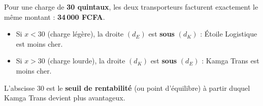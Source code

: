 \documentclass[11pt]{article}
\begin{document}
\begin{aretenir}
Pour une charge de \textbf{30 quintaux}, les deux transporteurs facturent exactement le même montant : \textbf{34\,000 FCFA}.
\begin{itemize}
    \item Si $x < 30$ (charge légère), la droite $(d_E)$ est \textbf{sous} $(d_K)$ : Étoile Logistique est moins cher.
    \item Si $x > 30$ (charge lourde), la droite $(d_K)$ est \textbf{sous} $(d_E)$ : Kamga Trans est moins cher.
\end{itemize}
L'abscisse 30 est le \textbf{seuil de rentabilité} (ou point d'équilibre) à partir duquel Kamga Trans devient plus avantageux.
\end{aretenir}
\end{document}
